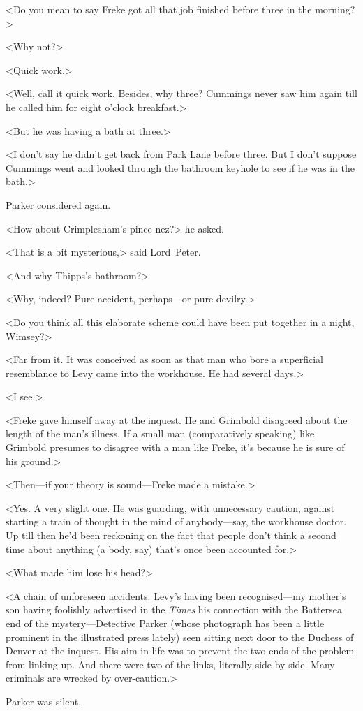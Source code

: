<Do you mean to say Freke got all that job finished before three in the morning?>

<Why not?>

<Quick work.>

<Well, call it quick work. Besides, why three? Cummings never saw him again till he called him for eight o'clock breakfast.>

<But he was having a bath at three.>

<I don't say he didn't get back from Park Lane before three. But I don't suppose Cummings went and looked through the bathroom keyhole to see if he was in the bath.>

Parker considered again.

<How about Crimplesham's pince-nez?> he asked.

<That is a bit mysterious,> said Lord~Peter.

<And why Thipps's bathroom?>

<Why, indeed? Pure accident, perhaps—or pure devilry.>

<Do you think all this elaborate scheme could have been put together in a night, Wimsey?>

<Far from it. It was conceived as soon as that man who bore a superficial resemblance to Levy came into the workhouse. He had several days.>

<I see.>

<Freke gave himself away at the inquest. He and Grimbold disagreed about the length of the man's illness. If a small man (comparatively speaking) like Grimbold presumes to disagree with a man like Freke, it's because he is sure of his ground.>

<Then—if your theory is sound—Freke made a mistake.>

<Yes. A very slight one. He was guarding, with unnecessary caution, against starting a train of thought in the mind of anybody—say, the workhouse doctor. Up till then he'd been reckoning on the fact that people don't think a second time about anything (a body, say) that's once been accounted for.>

<What made him lose his head?>

<A chain of unforeseen accidents. Levy's having been recognised—my mother's son having foolishly advertised in the \textit{Times} his connection with the Battersea end of the mystery—Detective Parker (whose photograph has been a little prominent in the illustrated press lately) seen sitting next door to the Duchess of Denver at the inquest. His aim in life was to prevent the two ends of the problem from linking up. And there were two of the links, literally side by side. Many criminals are wrecked by over-caution.>

Parker was silent.